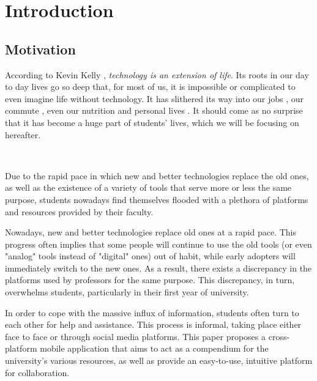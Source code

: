 \chapter{Introduction} \label{chapter1}

\section{Motivation} \label{1:motivation}

    According to Kevin Kelly \cite{kelly2010technology}, \textit{technology is an extension of life}. Its roots in our day to day lives go so deep that, for most of us, it is impossible or complicated to even imagine life without technology. It has slithered its way into our jobs \cite{lewis1996studying}, our commute \cite{kairi2019technology}, even our nutrition \cite{lewis2010role} and personal lives \cite{mcquillen2003influence}. It should come as no surprise that it has become a huge part of students' lives, which we will be focusing on hereafter.
    
    ~
    
    Due to the rapid pace in which new and better technologies replace the old ones, as well as the existence of a variety of tools that serve more or less the same purpose, students nowadays find themselves flooded with a plethora of platforms and resources provided by their faculty.
    
    Nowadays, new and better technologies replace old ones at a rapid pace. This progress often implies that some people will continue to use the old tools (or even "analog" tools instead of "digital" ones) out of habit, while early adopters will immediately switch to the new ones. As a result, there exists a discrepancy in the platforms used by professors for the same purpose. This discrepancy, in turn, overwhelms students, particularly in their first year of university.
    
    
    In order to cope with the massive influx of information, students often turn to each other for help and assistance. This process is informal, taking place either face to face or through social media platforms.
    \clearpage
    This paper proposes a cross-platform mobile application that aims to act as a compendium for the university's various resources, as well as provide an easy-to-use, intuitive platform for collaboration.

